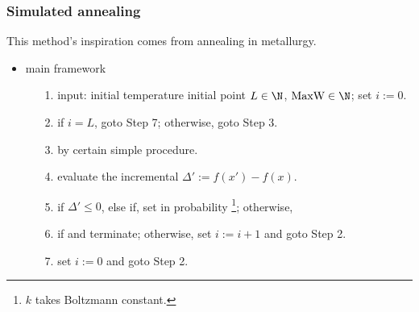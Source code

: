 	\subsubsection{Simulated annealing}
	This method's inspiration comes from annealing in metallurgy.
	\begin{itemize}
		\item main framework
		\begin{itemize}
			\item[1.] input: initial temperature  initial point  $L\in\N$,
			$\mbox{MaxW}\in\N$; set  $i:=0$.\\[1mm]
			\item[2.] if $i=L$, goto Step 7; otherwise, goto Step 3.\\[1mm]
			\item[3.]  by certain simple procedure.\\[1mm]
			\item[4.] evaluate the incremental $\Delta':=f(x')-f(x)$.\\[1mm]
			\item[5.] if $\Delta'\leq 0$,   else if, set
			  in probability \footnote{$k$ takes Boltzmann constant.}; otherwise,
			\\[1mm]
			\item[6.] if  and  terminate; otherwise,
			set $i:=i+1$ and goto Step 2.\\[1mm]
			\item[7.]  set $i:=0$ and goto Step 2.
		\end{itemize}
	\end{itemize}

